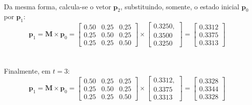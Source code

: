 \documentclass{report}
\begin{document}
\paragraph{} Da mesma forma, calcula-se o vetor $\mathbf{p}_2$, substituindo, somente, o estado inicial $\mathbf{p}_0$ por $\mathbf{p}_1$:\\

\begin{equation*}
\mathbf{p}_1 = \mathbf{M} \times \mathbf{p}_0 = \left[ \begin{array}{ccc}
0.50 & 0.25 & 0.25 \\ 
0.25 & 0.50 & 0.25 \\ 
0.25 & 0.25 & 0.50 
\end{array} \right] \times \left[\begin{array}{c}
0.3250, \\ 
0.3500 \\ 
0.3250
\end{array} \right] = \left[ \begin{array}{c}
0.3312 \\ 
0.3375 \\ 
0.3313
\end{array}  \right]
\end{equation*}\\

\paragraph{} Finalmente, em $t = 3$:\\

\begin{equation*}
\mathbf{p}_1 = \mathbf{M} \times \mathbf{p}_0 = \left[ \begin{array}{ccc}
0.50 & 0.25 & 0.25 \\ 
0.25 & 0.50 & 0.25 \\ 
0.25 & 0.25 & 0.50 
\end{array} \right] \times \left[\begin{array}{c}
0.3312, \\ 
0.3375 \\ 
0.3313
\end{array} \right] = \left[ \begin{array}{c}
0.3328 \\ 
0.3344 \\ 
0.3328
\end{array}  \right]
\end{equation*}\\
\end{document}
